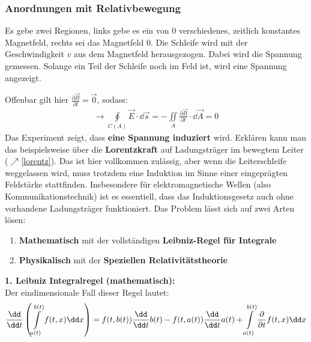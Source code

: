   \subsubsection{Anordnungen mit Relativbewegung}
  Es gebe zwei Regionen, links gebe es ein von 0 verschiedenes, zeitlich konstantes Magnetfeld, rechts sei das Magnetfeld 0. Die Schleife wird mit der Geschwindigkeit $v$ aus dem Magnetfeld herausgezogen. Dabei wird die Spannung gemessen. Solange ein Teil der Schleife noch im Feld ist, wird eine Spannung angezeigt.
	  \begin{center}
		  \resizebox{.3\textwidth}{!}{}
	  \end{center}
		   Offenbar gilt  hier $\frac{\partial \vec{B} }{\partial t} = \vec{0}$, sodass:
		        \begin{equation}\begin{split}\label{scheinparadox}
				        \to \oint\limits_{C(A)} \vec{E}\cdot\dd\vec{s} = -\iint\limits_{A} \frac{\partial \vec{B} }{\partial t} \cdot \dd \vec{A} = 0
			        \end{split}\end{equation}
		   Das Experiment zeigt, dass \textbf{eine Spannung induziert} wird. Erklären kann man das beispielsweise über die \textbf{Lorentzkraft} auf Ladungsträger im bewegtem Leiter ($\nearrow$\ref{lorentz}). Das ist hier vollkommen zulässig, aber wenn die Leiterschleife weggelassen wird, muss trotzdem eine Induktion im Sinne einer eingeprägten Feldstärke stattfinden. Insbesondere für elektromagnetische Wellen (also Kommunikationstechnik) ist es essentiell, dass das Induktionsgesetz auch ohne vorhandene Ladungsträger funktioniert. Das Problem lässt sich auf zwei Arten lösen:
		          \begin{enumerate}
			        \item \textbf{Mathematisch} mit der vollständigen \textbf{Leibniz-Regel für Integrale}
			        \item \textbf{Physikalisch} mit der \textbf{Speziellen Relativitätstheorie}
		        \end{enumerate}
	  \textbf{1. Leibniz Integralregel (mathematisch):}\\
			  Der eindimensionale Fall dieser Regel lautet:
			        \begin{equation}\begin{split}
					        \frac{\dd}{\dd t} \left( \int\displaylimits_{a(t)}^{b(t)} f(t,x)\dd x \right) = f(t,b(t)) \frac{\dd }{\dd t}b(t)  - f(t,a(t)) \frac{\dd }{\dd t}a(t) +  \int\displaylimits_{a(t)}^{b(t)} \frac{\partial}{\partial t}f(t,x)\dd x
				        \end{split}\end{equation}
